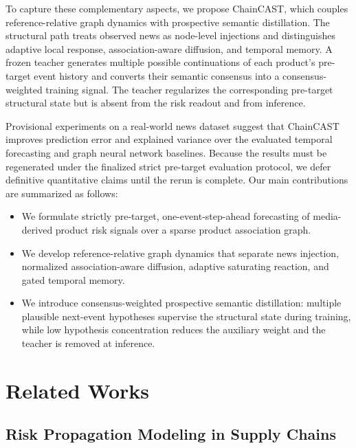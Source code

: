 \documentclass[letterpaper]{article} %
\begin{document}
To capture these complementary aspects, we propose ChainCAST, which couples reference-relative graph dynamics with prospective semantic distillation. The structural path treats observed news as node-level injections and distinguishes adaptive local response, association-aware diffusion, and temporal memory. A frozen teacher generates multiple possible continuations of each product's pre-target event history and converts their semantic consensus into a consensus-weighted training signal. The teacher regularizes the corresponding pre-target structural state but is absent from the risk readout and from inference.

Provisional experiments on a real-world news dataset suggest that ChainCAST improves prediction error and explained variance over the evaluated temporal forecasting and graph neural network baselines. Because the results must be regenerated under the finalized strict pre-target evaluation protocol, we defer definitive quantitative claims until the rerun is complete. Our main contributions are summarized as follows:

\begin{itemize}
    \item We formulate strictly pre-target, one-event-step-ahead forecasting of media-derived product risk signals over a sparse product association graph.
    \item We develop reference-relative graph dynamics that separate news injection, normalized association-aware diffusion, adaptive saturating reaction, and gated temporal memory.
    \item We introduce consensus-weighted prospective semantic distillation: multiple plausible next-event hypotheses supervise the structural state during training, while low hypothesis concentration reduces the auxiliary weight and the teacher is removed at inference.
\end{itemize}


\section{Related Works}

\subsection{Risk Propagation Modeling in Supply Chains}
\end{document}
